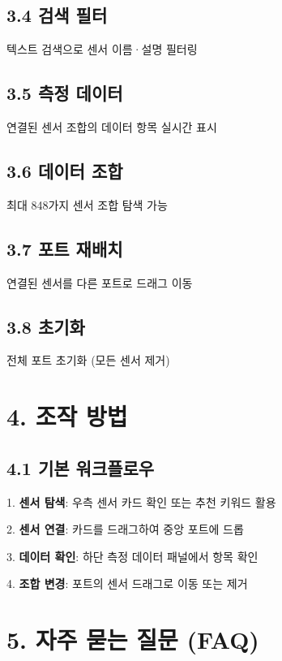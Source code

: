 \documentclass[11pt,a4paper]{article}
\begin{document}
\subsection*{3.4 검색 필터}

텍스트 검색으로 센서 이름·설명 필터링


\subsection*{3.5 측정 데이터}

연결된 센서 조합의 데이터 항목 실시간 표시


\subsection*{3.6 데이터 조합}

최대 848가지 센서 조합 탐색 가능


\subsection*{3.7 포트 재배치}

연결된 센서를 다른 포트로 드래그 이동


\subsection*{3.8 초기화}

전체 포트 초기화 (모든 센서 제거)



\section*{4. 조작 방법}

\subsection*{4.1 기본 워크플로우}

1. \textbf{센서 탐색}: 우측 센서 카드 확인 또는 추천 키워드 활용

2. \textbf{센서 연결}: 카드를 드래그하여 중앙 포트에 드롭

3. \textbf{데이터 확인}: 하단 측정 데이터 패널에서 항목 확인

4. \textbf{조합 변경}: 포트의 센서 드래그로 이동 또는 제거



\section*{5. 자주 묻는 질문 (FAQ)}
\end{document}
